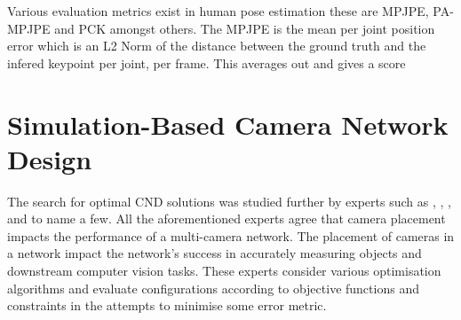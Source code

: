 Various evaluation metrics exist in human pose estimation these are MPJPE, PA-MPJPE and PCK amongst others. 
The MPJPE is the mean per joint position error which is an L2 Norm of the distance between the ground truth and the infered keypoint per joint, per frame. This averages out and gives a score


\section{Simulation-Based Camera Network Design}
\label{sec:relatedwork}
The search for optimal CND solutions was studied further by experts such as \citet{olague2002optimal}, \citet{gonzalez2009optimal}, \citet{zhao2013approximate}, \citet{rahimian2016optimal} and \citet{jorgensen2018simulation} to name a few. All the aforementioned experts agree that camera placement impacts the performance of a multi-camera network. The placement of cameras in a network impact the network's success in accurately measuring objects and downstream computer vision tasks.
These experts consider various optimisation algorithms and evaluate configurations according to objective functions and constraints in the attempts to minimise some error metric.


